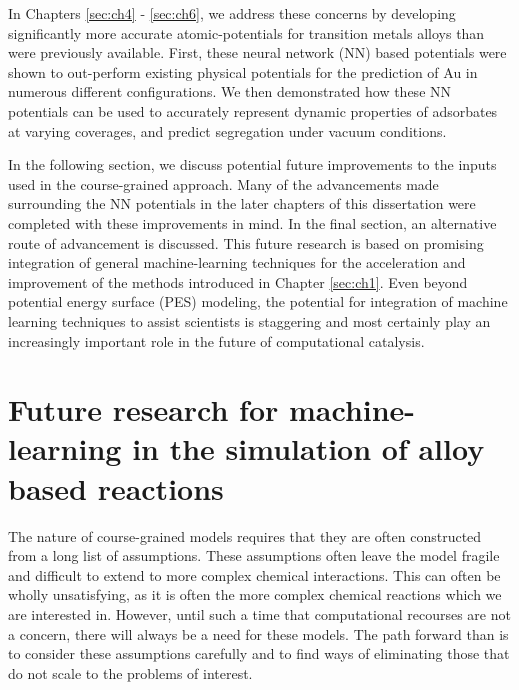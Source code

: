 \documentclass[12pt]{cmuthesis}
\begin{document}
In Chapters \ref{sec:ch4} - \ref{sec:ch6}, we address these concerns by developing significantly more accurate atomic-potentials for transition metals alloys than were previously available. First, these neural network (NN) based potentials were shown to out-perform existing physical potentials for the prediction of Au in numerous different configurations. We then demonstrated how these NN potentials can be used to accurately represent dynamic properties of adsorbates at varying coverages, and predict segregation under vacuum conditions.

In the following section, we discuss potential future improvements to the inputs used in the course-grained approach. Many of the advancements made surrounding the NN potentials in the later chapters of this dissertation were completed with these improvements in mind. In the final section, an alternative route of advancement is discussed. This future research is based on promising integration of general machine-learning techniques for the acceleration and improvement of the methods introduced in Chapter \ref{sec:ch1}. Even beyond potential energy surface (PES) modeling, the potential for integration of machine learning techniques to assist scientists is staggering and most certainly play an increasingly important role in the future of computational catalysis.

\section{Future research for machine-learning in the simulation of alloy based reactions}
\label{sec:org1211513}
The nature of course-grained models requires that they are often constructed from a long list of assumptions. These assumptions often leave the model fragile and difficult to extend to more complex chemical interactions. This can often be wholly unsatisfying, as it is often the more complex chemical reactions which we are interested in. However, until such a time that computational recourses are not a concern, there will always be a need for these models. The path forward than is to consider these assumptions carefully and to find ways of eliminating those that do not scale to the problems of interest.
\end{document}
